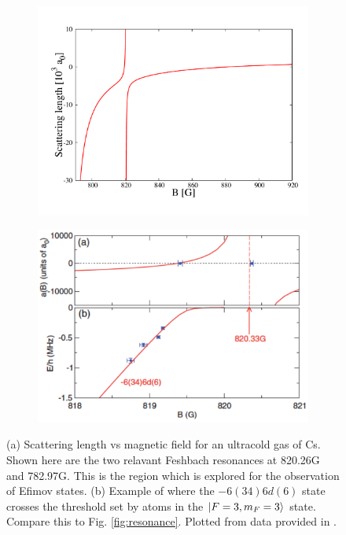 \documentclass[prl,onecolumn,amsmath,amssymb,titlepage,nofootinbib,preprint]{revtex4-1}
\begin{document}
\begin{figure}
	\centering
	\begin{subfigure}[b]{0.45\textwidth}
		\caption{}
		\includegraphics[width=\textwidth]{Figures/a_vs_B_M2012_2}
		\label{fig:a_vs_B_M2012}
	\end{subfigure}
	\begin{subfigure}[b]{0.45\textwidth}
		\caption{}
		\includegraphics[width=\textwidth]{Figures/Feshbach_crossing}
		\label{fig:feshbach_crossing}
	\end{subfigure}
	\caption{(a) Scattering length vs magnetic field for an ultracold gas of Cs.  Shown here are the two relavant Feshbach resonances at 820.26G and 782.97G.  This is the region which is explored for the observation of Efimov states. (b) Example of where the $-6(34)6d(6)$ state crosses the threshold set by atoms in the $\ket{F=3,m_{F}=3}$ state.  Compare this to Fig. \ref{fig:resonance}. Plotted from data provided in \cite{Berninger2013}.}
	
\end{figure}
\end{document}
